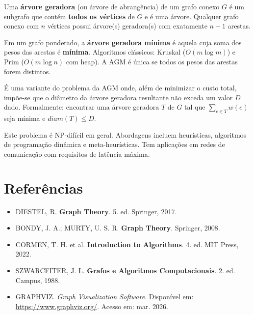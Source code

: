 \documentclass[12pt,a4paper]{article}
\begin{document}
\begin{description}[leftmargin=0pt]
  \item[Árvore Geradora] Uma \textbf{árvore geradora} (ou árvore de abrangência) de um grafo conexo $G$ é um subgrafo que contém \textbf{todos os vértices} de $G$ e é uma árvore. Qualquer grafo conexo com $n$ vértices possui árvore(s) geradora(s) com exatamente $n-1$ arestas.

  \item[Árvore Geradora Mínima (AGM)] Em um grafo ponderado, a \textbf{árvore geradora mínima} é aquela cuja soma dos pesos das arestas é \textbf{mínima}. Algoritmos clássicos: Kruskal ($O(m \log m)$) e Prim ($O(m \log n)$ com heap). A AGM é única se todos os pesos das arestas forem distintos.

  \item[Árvore Geradora Mínima com Restrição de Diâmetro (DCMST)] É uma variante do problema da AGM onde, além de minimizar o custo total, impõe-se que o diâmetro da árvore geradora resultante não exceda um valor $D$ dado. Formalmente: encontrar uma árvore geradora $T$ de $G$ tal que $\sum_{e \in T} w(e)$ seja mínima e $diam(T) \leq D$.

  Este problema é NP-difícil em geral. Abordagens incluem heurísticas, algoritmos de programação dinâmica e meta-heurísticas. Tem aplicações em redes de comunicação com requisitos de latência máxima.
\end{description}

\newpage
\section*{Referências}

\begin{itemize}
  \item DIESTEL, R. \textbf{Graph Theory}. 5. ed. Springer, 2017.
  \item BONDY, J. A.; MURTY, U. S. R. \textbf{Graph Theory}. Springer, 2008.
  \item CORMEN, T. H. et al. \textbf{Introduction to Algorithms}. 4. ed. MIT Press, 2022.
  \item SZWARCFITER, J. L. \textbf{Grafos e Algoritmos Computacionais}. 2. ed. Campus, 1988.
  \item GRAPHVIZ. \textit{Graph Visualization Software}. Disponível em: \url{https://www.graphviz.org/}. Acesso em: mar. 2026.
\end{itemize}
\end{document}
